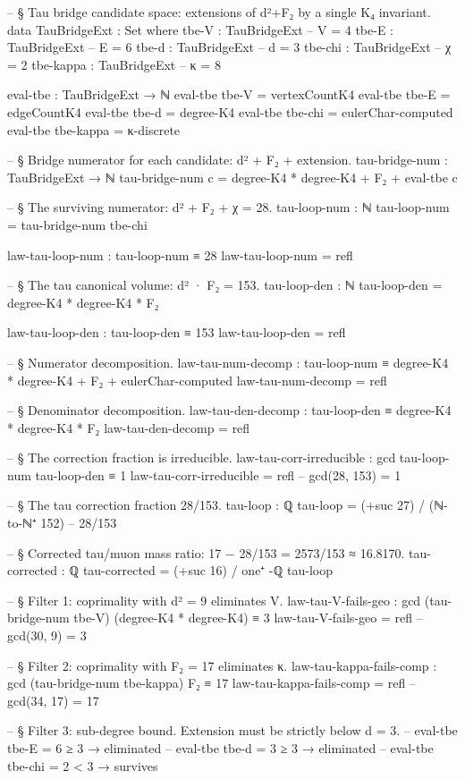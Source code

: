\documentclass[11pt,a4paper]{book}
\begin{document}
\begin{code}
-- § Tau bridge candidate space: extensions of d²+F₂ by a single K₄ invariant.
data TauBridgeExt : Set where
  tbe-V     : TauBridgeExt   -- V = 4
  tbe-E     : TauBridgeExt   -- E = 6
  tbe-d     : TauBridgeExt   -- d = 3
  tbe-chi   : TauBridgeExt   -- χ = 2
  tbe-kappa : TauBridgeExt   -- κ = 8

eval-tbe : TauBridgeExt → ℕ
eval-tbe tbe-V     = vertexCountK4
eval-tbe tbe-E     = edgeCountK4
eval-tbe tbe-d     = degree-K4
eval-tbe tbe-chi   = eulerChar-computed
eval-tbe tbe-kappa = κ-discrete

-- § Bridge numerator for each candidate: d² + F₂ + extension.
tau-bridge-num : TauBridgeExt → ℕ
tau-bridge-num c = degree-K4 * degree-K4 + F₂ + eval-tbe c

-- § The surviving numerator: d² + F₂ + χ = 28.
tau-loop-num : ℕ
tau-loop-num = tau-bridge-num tbe-chi

law-tau-loop-num : tau-loop-num ≡ 28
law-tau-loop-num = refl

-- § The tau canonical volume: d² · F₂ = 153.
tau-loop-den : ℕ
tau-loop-den = degree-K4 * degree-K4 * F₂

law-tau-loop-den : tau-loop-den ≡ 153
law-tau-loop-den = refl

-- § Numerator decomposition.
law-tau-num-decomp : tau-loop-num ≡ degree-K4 * degree-K4 + F₂ + eulerChar-computed
law-tau-num-decomp = refl

-- § Denominator decomposition.
law-tau-den-decomp : tau-loop-den ≡ degree-K4 * degree-K4 * F₂
law-tau-den-decomp = refl

-- § The correction fraction is irreducible.
law-tau-corr-irreducible : gcd tau-loop-num tau-loop-den ≡ 1
law-tau-corr-irreducible = refl   -- gcd(28, 153) = 1

-- § The tau correction fraction 28/153.
tau-loop : ℚ
tau-loop = (+suc 27) / (ℕ-to-ℕ⁺ 152)    -- 28/153

-- § Corrected tau/muon mass ratio: 17 − 28/153 = 2573/153 ≈ 16.8170.
tau-corrected : ℚ
tau-corrected = (+suc 16) / one⁺ -ℚ tau-loop

-- § Filter 1: coprimality with d² = 9 eliminates V.
law-tau-V-fails-geo : gcd (tau-bridge-num tbe-V) (degree-K4 * degree-K4) ≡ 3
law-tau-V-fails-geo = refl   -- gcd(30, 9) = 3

-- § Filter 2: coprimality with F₂ = 17 eliminates κ.
law-tau-kappa-fails-comp : gcd (tau-bridge-num tbe-kappa) F₂ ≡ 17
law-tau-kappa-fails-comp = refl   -- gcd(34, 17) = 17

-- § Filter 3: sub-degree bound.  Extension must be strictly below d = 3.
-- eval-tbe tbe-E = 6 ≥ 3 → eliminated
-- eval-tbe tbe-d = 3 ≥ 3 → eliminated
-- eval-tbe tbe-chi = 2 < 3 → survives


\end{code}
\end{document}
